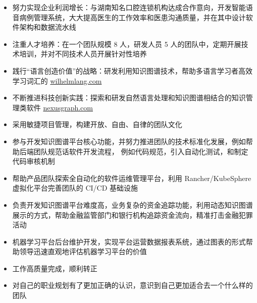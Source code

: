 \documentclass[10pt,a4paper,ragged2e,withhyper]{altacv}
\begin{document}

\makecvheader

\begin{paracol}{2}

    \begin{itemize}
        \item 努力实现企业利润增长：与湖南知名口腔连锁机构达成合作意向，开发智能语音病例管理系统，大大提高医生的工作效率和医患沟通质量，并在其中设计软件架构和数据流水线
        \item 注重人才培养：在一个团队规模 8 人，研发人员 5 人的团队中，定期开展技术培训，并对不同技术人员开展针对性培养
        \item 践行“语言创造价值”的战略：研发利用知识图谱技术，帮助多语言学习者高效学习词汇的 \href{https://wilhelmlang.com/}{wilhelmlang.com}
        \item 不断推进科技创新实践：探索和研发自然语言处理和知识图谱相结合的知识管理类软件 \href{https://nexusgraph.com/}{nexusgraph.com}
        \item 采用敏捷项目管理，构建开放、自由、自律的团队文化
    \end{itemize}

    \divider

    \begin{itemize}
        \item 参与开发知识图谱平台核心功能，并努力推进团队的技术标准化发展，例如帮助后端团队规范话软件开发流程，
              例如代码规范，引入自动化测试，和制定代码审核机制
        \item 帮助产品团队探索全自动化的软件运维管理平台，利用 Rancher/KubeSphere 虚拟化平台完善团队的 CI/CD 基础设施
        \item 负责开发知识图谱平台难度高，业务复杂的资金追踪功能，利用动态知识图谱展示的方式，帮助金融监管部门和银行机构追踪资金流向，精准打击金融犯罪活动
    \end{itemize}

    \divider

    \begin{itemize}
        \item 机器学习平台后台维护开发，实现平台运营数据报表系统，通过图表的形式帮助领导迅速直观地评估机器学习平台的价值
        \item 工作高质量完成，顺利转正
        \item 对自己的职业规划有了更加正确的认识，意识到自己更加适合去一个什么样的团队
    \end{itemize}


\end{paracol}
\end{document}
